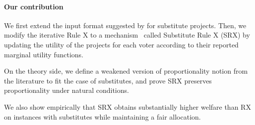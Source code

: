\documentclass[runningheads]{llncs}
\newcommand{\kibitz}[2]{\ifnum\Comments=1{\color{#1}{#2}}\fi}
\newcommand{\rmr}[1]{\kibitz{red}{[Reshef says:#1]}}
\newcommand{\rf}[1]{\kibitz{blue}{[Roy says:#1]}}
\begin{document}
\paragraph{Our contribution} 
We first extend the input format suggested by \citet{jain2020participatory} for substitute projects. Then, we modify the iterative Rule X to a mechanism~\cite{peters2020proportionality} called Substitute Rule X (SRX) by updating the utility of the projects for each voter according to their reported marginal utility functions.


On the theory side,  we define a weakened version of proportionality notion from the literature to fit the case of substitutes, and prove SRX preserves proportionality under natural conditions. 

We also show empirically that SRX obtains substantially higher welfare than RX on instances with substitutes while maintaining a fair allocation.


\end{document}
